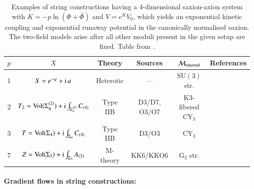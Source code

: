\begin{table}[htp]
\begin{center}
\begin{tabular}{l c c c c c }\hline
\cellcolor[gray]{0.9} $p$ & \cellcolor[gray]{0.9} $X$ & \cellcolor[gray]{0.9} Theory & \cellcolor[gray]{0.9} Sources &   \cellcolor[gray]{0.9} $\mathcal{M}_{\rm internal}$ & \cellcolor[gray]{0.9} References \\ [5pt]
\hline
$1$ & $S = e^{-\varphi} + {\rm i}\, a$ & Heterotic & --- & $\mathrm{SU}(3)$ str. & \cite{Font:1990nt} 
\\ [5pt]
$2$ & $T_2 = {\rm Vol}(\Sigma_4^{(2)}) + {\rm i} \int_{\Sigma_4^{(2)}} C_{(4)}$ & Type IIB & D3/D7, O3/O7 & K3-fibered $\mathrm{CY}_3$  & \cite{Cicoli:2011it,Cicoli:2016xae,Cicoli:2017axo} 
\\[5pt]
$3$ & $T = {\rm Vol}(\Sigma_4) + {\rm i} \int_{\Sigma_4} C_{(4)}$ & Type IIB & D3/O3 & $\mathrm{CY}_3$  & \cite{Saltman:2004sn} 
\\[5pt]
$7$ & $Z = {\rm Vol}(\Sigma_3) +{\rm i}\int_{\Sigma_3} A_{(3)}$ & M-theory & KK6/KKO6 & $\mathrm{G}_2$ str. & \cite{Blaback:2019zig}
\\[5pt]
\bottomrule
\end{tabular}
\end{center}
\caption{Examples of string constructions having a 4-dimensional saxion-axion system with $K=-p\ln(\Phi+\bar{\Phi})$ and $V=e^K V_0$, which yields an exponential kinetic coupling and exponential runaway potential in the canonically normalised saxion. The two-field models arise after all other moduli present in the given setup are fixed. Table from \cite{Brinkmann:2022oxy}.}
\label{T:multiunimodq}
\end{table}

\paragraph{Gradient flows in string constructions:}


